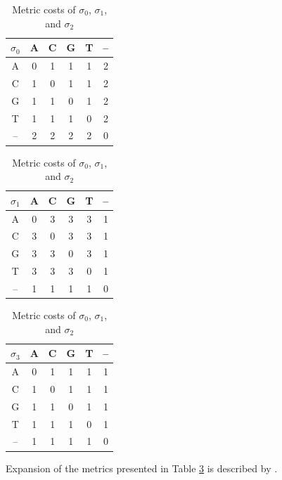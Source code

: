 \documentclass{bmcart}
\begin{document}
\begin{backmatter}
    \begin{table}[!hbt]
    	\caption{Metric costs of $\sigma_0$, $\sigma_1$, and $\sigma_2$}
    	\label{Tab:Metrics}
    	\begin{minipage}{0.33\textwidth}
    		\centering
    		\begin{tabular}{c|ccccc}
    			$\sigma_0$ & A & C & G & T & -- \\ \hline
    			A  & 0 & 1 & 1 & 1 & 2  \\
    			C  & 1 & 0 & 1 & 1 & 2  \\
    			G  & 1 & 1 & 0 & 1 & 2  \\
    			T  & 1 & 1 & 1 & 0 & 2  \\
    			-- & 2 & 2 & 2 & 2 & 0
    		\end{tabular}
    	\end{minipage}
    	\hfill
    	\begin{minipage}{0.3\textwidth}
    		\centering
    		\begin{tabular}{c|ccccc}
    			$\sigma_1$ & A & C & G & T & -- \\ \hline
    			A  & 0 & 3 & 3 & 3 & 1  \\
    			C  & 3 & 0 & 3 & 3 & 1  \\
    			G  & 3 & 3 & 0 & 3 & 1  \\
    			T  & 3 & 3 & 3 & 0 & 1  \\
    			-- & 1 & 1 & 1 & 1 & 0
    		\end{tabular}
    	\end{minipage}
        \hfill
        \begin{minipage}{0.3\textwidth}
    	\centering
    	\begin{tabular}{c|ccccc}
    		$\sigma_3$ & A & C & G & T & -- \\ \hline
    		A  & 0 & 1 & 1 & 1 & 1  \\
    		C  & 1 & 0 & 1 & 1 & 1  \\
    		G  & 1 & 1 & 0 & 1 & 1  \\
    		T  & 1 & 1 & 1 & 0 & 1  \\
    		-- & 1 & 1 & 1 & 1 & 0
    	\end{tabular}
        \end{minipage}\par
        \vspace{0.75em}\raggedright
        Expansion of the metrics presented in Table \ref{Tab:Metrics} is described by \cite{VaronandWheeler2012}.
    \end{table}


\end{backmatter}
\end{document}
